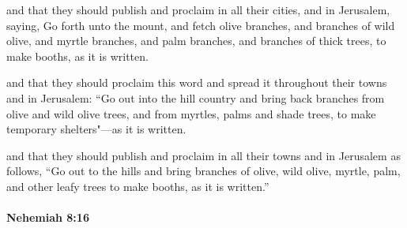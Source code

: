 			\begin{versebox}
					\item[BHS] 
					\item[LXX] 
					\item[ASV] and that they should publish and proclaim in all their cities, and in Jerusalem, saying, Go forth unto the mount, and fetch olive branches, and branches of wild olive, and myrtle branches, and palm branches, and branches of thick trees, to make booths, as it is written.
					\item[NIV] and that they should proclaim this word and spread it throughout their towns and in Jerusalem: “Go out into the hill country and bring back branches from olive and wild olive trees, and from myrtles, palms and shade trees, to make temporary shelters"—as it is written.
					\item[NRSV] and that they should publish and proclaim in all their towns and in Jerusalem as follows, “Go out to the hills and bring branches of olive, wild olive, myrtle, palm, and other leafy trees to make booths, as it is written.”
			\end{versebox}

		\paragraph{Nehemiah 8:16} %
			\label{NEHEMIAH-8-16}

